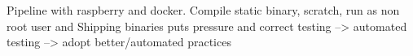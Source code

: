 Pipeline with raspberry and docker. Compile static binary, scratch, run as non root user and 
Shipping binaries puts pressure and correct testing --> automated testing --> adopt better/automated practices
